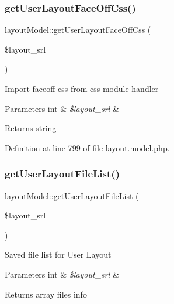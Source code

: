 \hypertarget{classlayoutModel_a82cac2109b93170e8f573576de2eb0d0}{}\label{classlayoutModel_a82cac2109b93170e8f573576de2eb0d0} 
\subsubsection{\texorpdfstring{get\+User\+Layout\+Face\+Off\+Css()}{getUserLayoutFaceOffCss()}}
{\footnotesize\ttfamily layout\+Model\+::get\+User\+Layout\+Face\+Off\+Css (\begin{DoxyParamCaption}\item[{}]{\$layout\+\_\+srl }\end{DoxyParamCaption})}

Import faceoff css from css module handler 
\begin{DoxyParams}[1]{Parameters}
int & {\em \$layout\+\_\+srl} & \\
\hline
\end{DoxyParams}
\begin{DoxyReturn}{Returns}
string 
\end{DoxyReturn}


Definition at line 799 of file layout.\+model.\+php.

\hypertarget{classlayoutModel_a068c761aeebdbc423b005a2e793b1b21}{}\label{classlayoutModel_a068c761aeebdbc423b005a2e793b1b21} 
\subsubsection{\texorpdfstring{get\+User\+Layout\+File\+List()}{getUserLayoutFileList()}}
{\footnotesize\ttfamily layout\+Model\+::get\+User\+Layout\+File\+List (\begin{DoxyParamCaption}\item[{}]{\$layout\+\_\+srl }\end{DoxyParamCaption})}

Saved file list for User Layout 
\begin{DoxyParams}[1]{Parameters}
int & {\em \$layout\+\_\+srl} & \\
\hline
\end{DoxyParams}
\begin{DoxyReturn}{Returns}
array files info 
\end{DoxyReturn}


